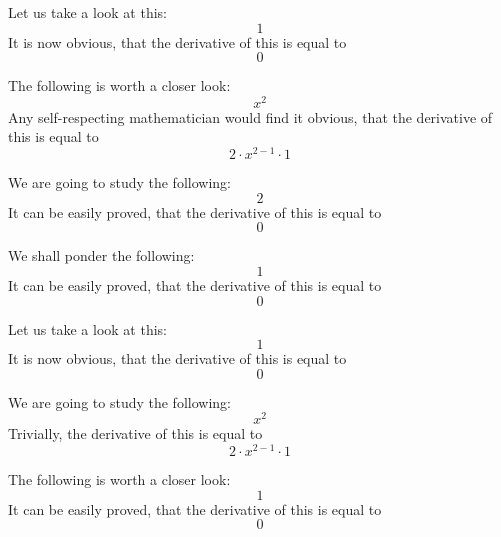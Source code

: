 \documentclass{article}
\begin{document}
Let us take a look at this:
\begin{equation}
1 
\end{equation}
It is now obvious, that the derivative of this is equal to
\begin{equation}
0 
\end{equation}

The following is worth a closer look:
\begin{equation}
x ^{2 } 
\end{equation}
Any self-respecting mathematician would find it obvious, that the derivative of this is equal to
\begin{equation}
2 \cdot x ^{2 - 1 } \cdot 1 
\end{equation}

We are going to study the following:
\begin{equation}
2 
\end{equation}
It can be easily proved, that the derivative of this is equal to
\begin{equation}
0 
\end{equation}

We shall ponder the following:
\begin{equation}
1 
\end{equation}
It can be easily proved, that the derivative of this is equal to
\begin{equation}
0 
\end{equation}

Let us take a look at this:
\begin{equation}
1 
\end{equation}
It is now obvious, that the derivative of this is equal to
\begin{equation}
0 
\end{equation}

We are going to study the following:
\begin{equation}
x ^{2 } 
\end{equation}
Trivially, the derivative of this is equal to
\begin{equation}
2 \cdot x ^{2 - 1 } \cdot 1 
\end{equation}

The following is worth a closer look:
\begin{equation}
1 
\end{equation}
It can be easily proved, that the derivative of this is equal to
\begin{equation}
0 
\end{equation}
\end{document}
